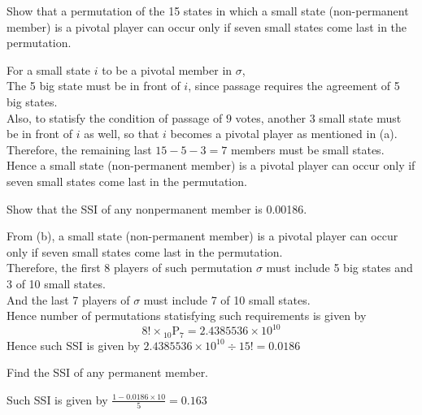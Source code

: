 \documentclass[12pt]{article}
\newenvironment{question}[2][Q]{\begin{trivlist}
    \item[\hskip \labelsep {\bfseries #1}\hskip \labelsep {\bfseries #2.}]}{\end{trivlist}}
\newenvironment{answer}[2][A]{\begin{trivlist}
    \item[\hskip \labelsep {\bfseries #1}\hskip \labelsep {\bfseries #2.}]}{\end{trivlist}}
\begin{document}
\begin{question}{2b}
	Show that a permutation of the 15 states in which a small state (non-permanent member)  is a pivotal player can occur only if seven small states come last in the permutation.
\end{question}
\begin{answer}{2b}
\end{answer}
For a small state $i$ to be a pivotal member in $\sigma$,\\
The 5 big state must be  in front of $i$, since passage requires the agreement of 5 big states. \\
Also, to statisfy the condition of passage of $9$ votes, another 3 small state must be in front of $i$ as well, so that $i$ becomes a pivotal player as mentioned in (a). \\
Therefore, the remaining last $15-5-3=7$ members must be small states.
Hence a small state (non-permanent member) is a pivotal player can occur only if seven small states come last in the permutation.

\begin{question}{2c}
	Show that the SSI of any nonpermanent member is 0.00186.
\end{question}
\begin{answer}{2c}
\end{answer}
From (b), a small state (non-permanent member) is a pivotal player can occur only if seven small states come last in the permutation. \\
Therefore, the first 8 players of such permutation $\sigma$ must include 5 big states and 3 of 10 small states. \\
And the last 7 players of $\sigma$ must include 7 of 10 small states. \\
Hence number of permutations statisfying such requirements is given by
\begin{equation}
	8! \times {}_{10} \mathrm P_7 = 2.4385536 \times 10^{10}
\end{equation}
Hence such SSI is given by $2.4385536 \times 10^{10} \div 15! = 0.0186$

\begin{question}{2d}
	Find the SSI of any permanent member.
\end{question}
\begin{answer}{2d}
	Such SSI is given by $\frac{1-0.0186\times 10}5=0.163$
\end{answer}

\end{document}
